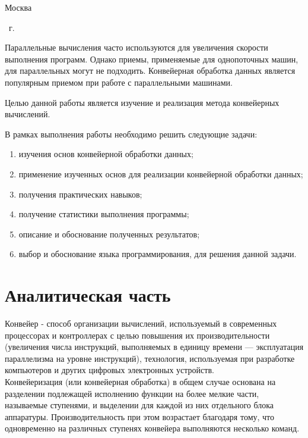 \begin{center}
    \mbox{}
    \vfill
    Москва
\end{center}

\begin{center}
    \the\year ~г.
\end{center}
\clearpage

\renewcommand\contentsname{\hfill{\normalfont{СОДЕРЖАНИЕ}}\hfill}  %
\tableofcontents
\newpage


Параллельные вычисления часто используются для увеличения скорости выполнения
программ. Однако приемы, применяемые для однопоточных машин, для
параллельных могут не подходить. Конвейерная обработка данных является
популярным приемом при работе с параллельными машинами.

Целью данной работы является изучение и реализация метода конвейерных вычислений.

В рамках выполнения работы необходимо решить следующие задачи:

\begin{enumerate}
    \item изучения основ конвейерной обработки данных;
    \item применение изученных основ для реализации конвейерной обработки данных;
    \item получения практических навыков;
    \item получение статистики выполнения программы;
    \item описание и обоснование полученных результатов;
    \item выбор и обоснование языка программирования, для решения данной задачи.
\end{enumerate}

\section{Аналитическая часть}
Конвейер - способ организации вычислений, используемый в современных процессорах и контроллерах с целью повышения их производительности (увеличения числа инструкций, выполняемых в единицу времени — эксплуатация параллелизма на уровне инструкций), технология, используемая при разработке компьютеров и других цифровых электронных устройств. \\
Конвейеризация (или конвейерная обработка) в общем случае основана на разделении подлежащей исполнению функции на более мелкие части, называемые ступенями, и выделении для каждой из них отдельного блока аппаратуры. Производительность при этом возрастает благодаря тому, что одновременно на различных ступенях конвейера выполняются несколько команд.\\

